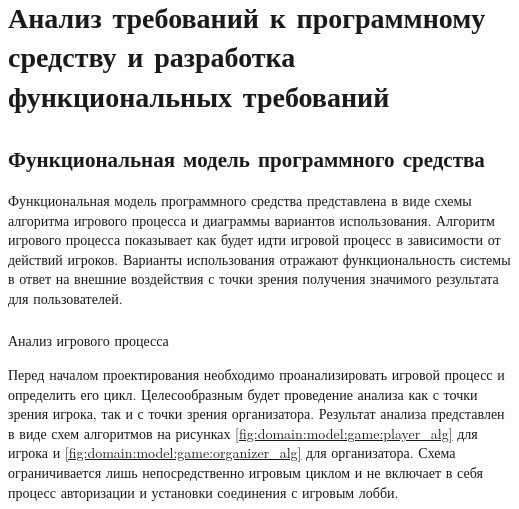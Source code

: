 \section{Анализ требований к программному средству и разработка функциональных требований}
\label{sec:domain}

\subsection{Функциональная модель программного средства}
\label{sec:domain:model}

Функциональная модель программного средства представлена в виде схемы алгоритма игрового процесса и диаграммы вариантов использования. Алгоритм игрового 
процесса показывает как будет идти игровой процесс в зависимости от действий игроков. Варианты использования отражают функциональность системы в ответ на внешние 
воздействия с точки зрения получения значимого результата для пользователей.

\subsubsection{} Анализ игрового процесса
\label{sec:domain:model:game}

Перед началом проектирования необходимо проанализировать игровой процесс и определить его цикл. Целесообразным будет проведение анализа как с точки зрения игрока, так и 
с точки зрения организатора. Результат анализа представлен в виде схем алгоритмов на рисунках \ref{fig:domain:model:game:player_alg} для игрока 
и \ref{fig:domain:model:game:organizer_alg} для организатора. 
Схема ограничивается лишь непосредственно игровым циклом и не включает в себя процесс авторизации и установки соединения с игровым лобби.

